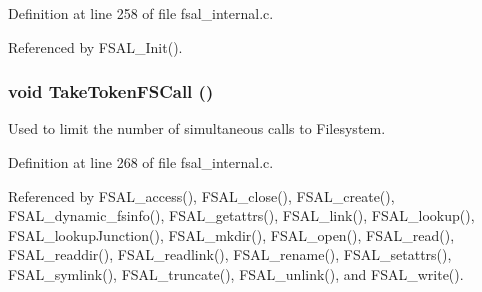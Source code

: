 Definition at line 258 of file fsal\_\-internal.c.

Referenced by FSAL\_\-Init().
\subsubsection[{TakeTokenFSCall}]{\setlength{\rightskip}{0pt plus 5cm}void TakeTokenFSCall ()}\label{fsal__internal_8c_880a1463c400047bfd0401f0b9c431a7}


Used to limit the number of simultaneous calls to Filesystem. 

Definition at line 268 of file fsal\_\-internal.c.

Referenced by FSAL\_\-access(), FSAL\_\-close(), FSAL\_\-create(), FSAL\_\-dynamic\_\-fsinfo(), FSAL\_\-getattrs(), FSAL\_\-link(), FSAL\_\-lookup(), FSAL\_\-lookupJunction(), FSAL\_\-mkdir(), FSAL\_\-open(), FSAL\_\-read(), FSAL\_\-readdir(), FSAL\_\-readlink(), FSAL\_\-rename(), FSAL\_\-setattrs(), FSAL\_\-symlink(), FSAL\_\-truncate(), FSAL\_\-unlink(), and FSAL\_\-write().
